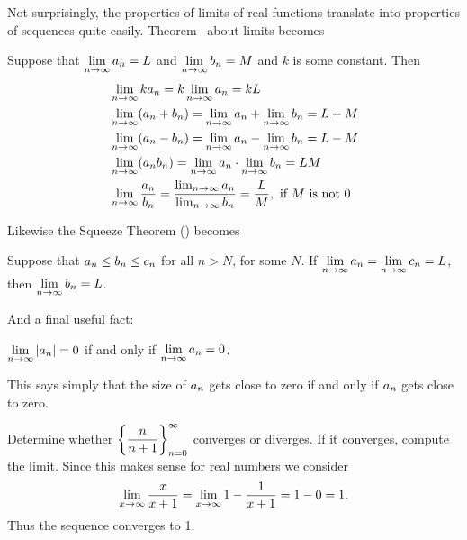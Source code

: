 Not surprisingly, the properties of limits of real functions translate
into properties of sequences quite easily. 
Theorem~ about limits becomes

\begin{theorem} \relax\label{thm:properties of sequences}
Suppose that $\displaystyle\lim_{n\to\infty}a_n=L$ and 
$\displaystyle\lim_{n\to\infty}b_n=M$ and
$k$ is some constant. Then
\begin{align*}
&\lim_{n\to\infty} ka_n = k\lim_{n\to\infty}a_n=kL \\
&\lim_{n\to\infty} (a_n+b_n) = \lim_{n\to\infty}a_n+\lim_{n\to\infty}b_n=L+M \\
&\lim_{n\to\infty} (a_n-b_n) = \lim_{n\to\infty}a_n-\lim_{n\to\infty}b_n=L-M \\
&\lim_{n\to\infty} (a_nb_n) = \lim_{n\to\infty}a_n\cdot\lim_{n\to\infty}b_n=LM \\
&\lim_{n\to\infty} {a_n\over b_n} = {\lim_{n\to\infty}a_n\over
  \lim_{n\to\infty}b_n}={L\over M},\hbox{ if $M$ is not 0} \\
\end{align*}
\end{theorem}

Likewise the Squeeze Theorem () becomes

\begin{theorem}\relax\label{thm:squeeze theorem for sequences}
Suppose that $\displaystyle a_n \le b_n \le c_n$ for all $n>N$, for some $N$.
If $\displaystyle\lim_{n\to\infty}a_n=\displaystyle\lim_{n\to\infty}c_n=L$, 
then $\displaystyle\lim_{n\to\infty}b_n=L$.
\end{theorem}

And a final useful fact:

\begin{theorem} \relax\label{thm:absolute value sequence}
$\displaystyle\lim_{n\to\infty}|a_n|=0$ if and only if
$\displaystyle\lim_{n\to\infty}a_n=0$.
\end{theorem}

This says simply that the size of $\displaystyle a_n$ gets close to zero if and
only if $\displaystyle a_n$ gets close to zero.

\begin{example}
Determine whether $\displaystyle\left\{{n\over n+1}\right\}_{n=0}^\infty$ converges or
diverges. If it converges, compute the limit. Since this makes sense
for real numbers we consider
$$
\lim_{x\to\infty}{x\over x+1}=\lim_{x\to\infty}1-{1\over x+1}=1-0=1.
$$
Thus the sequence converges to 1.
\end{example}

